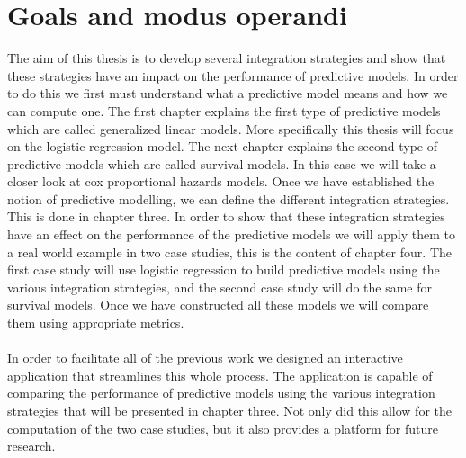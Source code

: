 \section{Goals and modus operandi}
The aim of this thesis is to develop several integration strategies and show that these strategies have an impact on the performance of predictive models. In order to do this we first must understand what a predictive model means and how we can compute one. The first chapter explains the first type of predictive models which are called generalized linear models. More specifically this thesis will focus on the logistic regression model. The next chapter explains the second type of predictive models which are called survival models. In this case we will take a closer look at cox proportional hazards models. Once we have established the notion of predictive modelling, we can define the different integration strategies. This is done in chapter three. In order to show that these integration strategies have an effect on the performance of the predictive models we will apply them to a real world example in two case studies, this is the content of chapter four. The first case study will use logistic regression to build predictive models using the various integration strategies, and the second case study will do the same for survival models. Once we have constructed all these models we will compare them using appropriate metrics. \\ \\
In order to facilitate all of the previous work we designed an interactive application that streamlines this whole process. The application is capable of comparing the performance of predictive models using the various integration strategies that will be presented in chapter three. Not only did this allow for the computation of the two case studies, but it also provides a platform for future research. 

